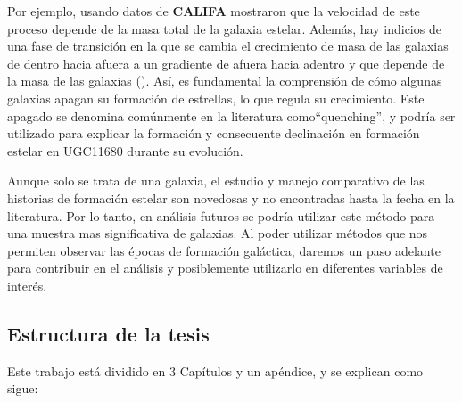 \noindent Por ejemplo, usando datos de \textbf{CALIFA} \cite{perez2013} mostraron que la velocidad de este proceso
depende de la masa total de la galaxia estelar. Además, hay indicios de
una fase de transición en la que se cambia el crecimiento de masa de las galaxias de dentro hacia afuera
a un gradiente de afuera hacia adentro y que depende de la masa de las galaxias (\cite{perez2013}). Así, es fundamental la comprensión de cómo algunas galaxias apagan su formación de estrellas, lo que regula su crecimiento. Este apagado
se denomina comúnmente en la literatura  como``quenching'', y
podría ser utilizado para explicar la formación y consecuente declinación en formación estelar en UGC11680 durante su evolución.

\bigskip

\noindent Aunque solo se trata de una galaxia, el estudio y manejo comparativo de las historias de formación estelar
son novedosas y no encontradas hasta la fecha en la literatura. Por lo tanto,
en análisis futuros se podría utilizar este método para una muestra mas significativa de galaxias.
Al poder utilizar métodos que nos permiten observar las épocas de formación galáctica, daremos un paso adelante para contribuir
en el análisis y posiblemente utilizarlo en diferentes variables de interés.

\bigskip


\subsection{Estructura de la tesis}

Este trabajo está dividido en 3 Capítulos y un apéndice, y se explican como sigue:

